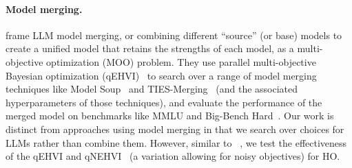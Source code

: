 \paragraph{Model merging.} \citet{li2024s} frame LLM model merging, or combining different ``source'' (or base) models to create a unified model that retains the strengths of each model, as a multi-objective optimization (MOO) problem. They use parallel multi-objective Bayesian optimization (qEHVI)~\citep{daulton2020differentiable} to search over a range of model merging techniques like Model Soup~\citep{wortsman2022model} and TIES-Merging~\citep{yadav2024ties} (and the associated hyperparameters of those techniques), and evaluate the performance of the merged model on benchmarks like MMLU and Big-Bench Hard~\citep{suzgun2022challenging}. Our work is distinct from approaches using model merging in that we search over choices for LLMs rather than combine them. However, similar to ~\citet{li2024s}, we test the effectiveness of the qEHVI and qNEHVI~\citep{daulton2021parallel} (a variation allowing for noisy objectives) for HO.
